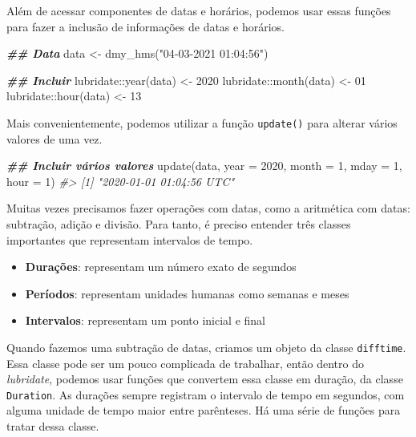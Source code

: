 \documentclass[
]{book}
\newenvironment{Shaded}{\begin{snugshade}}{\end{snugshade}}
\newcommand{\AttributeTok}[1]{\textcolor[rgb]{0.61,0.61,0.61}{#1}}
\newcommand{\CommentTok}[1]{\textcolor[rgb]{0.37,0.37,0.37}{\textit{#1}}}
\newcommand{\DecValTok}[1]{\textcolor[rgb]{0.06,0.06,0.06}{#1}}
\newcommand{\DocumentationTok}[1]{\textcolor[rgb]{0.37,0.37,0.37}{\textbf{\textit{#1}}}}
\newcommand{\FunctionTok}[1]{\textcolor[rgb]{0,0,0}{#1}}
\newcommand{\NormalTok}[1]{#1}
\newcommand{\OtherTok}[1]{\textcolor[rgb]{0.37,0.37,0.37}{#1}}
\newcommand{\SpecialCharTok}[1]{\textcolor[rgb]{0,0,0}{#1}}
\newcommand{\StringTok}[1]{\textcolor[rgb]{0.5,0.5,0.5}{#1}}
\providecommand{\tightlist}{%
  \setlength{\itemsep}{0pt}\setlength{\parskip}{0pt}}
\begin{document}
Além de acessar componentes de datas e horários, podemos usar essas funções para fazer a inclusão de informações de datas e horários.

\begin{Shaded}
\begin{Highlighting}[]
\DocumentationTok{\#\# Data}
\NormalTok{data }\OtherTok{\textless{}{-}} \FunctionTok{dmy\_hms}\NormalTok{(}\StringTok{"04{-}03{-}2021 01:04:56"}\NormalTok{)}

\DocumentationTok{\#\# Incluir}
\NormalTok{lubridate}\SpecialCharTok{::}\FunctionTok{year}\NormalTok{(data) }\OtherTok{\textless{}{-}} \DecValTok{2020}
\NormalTok{lubridate}\SpecialCharTok{::}\FunctionTok{month}\NormalTok{(data) }\OtherTok{\textless{}{-}} \DecValTok{01}
\NormalTok{lubridate}\SpecialCharTok{::}\FunctionTok{hour}\NormalTok{(data) }\OtherTok{\textless{}{-}} \DecValTok{13}
\end{Highlighting}
\end{Shaded}

Mais convenientemente, podemos utilizar a função \texttt{update()} para alterar vários valores de uma vez.

\begin{Shaded}
\begin{Highlighting}[]
\DocumentationTok{\#\# Incluir vários valores}
\FunctionTok{update}\NormalTok{(data, }\AttributeTok{year =} \DecValTok{2020}\NormalTok{, }\AttributeTok{month =} \DecValTok{1}\NormalTok{, }\AttributeTok{mday =} \DecValTok{1}\NormalTok{, }\AttributeTok{hour =} \DecValTok{1}\NormalTok{)}
\CommentTok{\#\textgreater{} [1] "2020{-}01{-}01 01:04:56 UTC"}
\end{Highlighting}
\end{Shaded}

Muitas vezes precisamos fazer operações com datas, como a aritmética com datas: subtração, adição e divisão. Para tanto, é preciso entender três classes importantes que representam intervalos de tempo.

\begin{itemize}
\tightlist
\item
  \textbf{Durações}: representam um número exato de segundos
\item
  \textbf{Períodos}: representam unidades humanas como semanas e meses
\item
  \textbf{Intervalos}: representam um ponto inicial e final
\end{itemize}

Quando fazemos uma subtração de datas, criamos um objeto da classe \texttt{difftime}. Essa classe pode ser um pouco complicada de trabalhar, então dentro do \emph{lubridate}, podemos usar funções que convertem essa classe em duração, da classe \texttt{Duration}. As durações sempre registram o intervalo de tempo em segundos, com alguma unidade de tempo maior entre parênteses. Há uma série de funções para tratar dessa classe.
\end{document}
